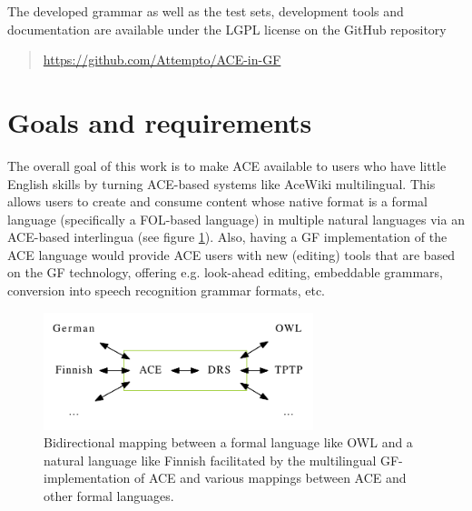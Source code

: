 \documentclass[a4paper]{article}
\begin{document}
The developed grammar as well as the test sets, development tools and
documentation are available under the LGPL license on the GitHub repository

\begin{quote}
\url{https://github.com/Attempto/ACE-in-GF}
\end{quote}

\section{Goals and requirements}
\label{section:Goals_and_requirements}

The overall goal of this work is to make ACE available to users who have little
English skills by turning ACE-based systems like
AceWiki \cite{kuhn2010doctoralthesis} multilingual. This allows users
to create and consume content whose native format is a formal language
(specifically a FOL-based language) in multiple natural languages
via an ACE-based interlingua (see figure \ref{fig:languages}).
Also, having a GF implementation of the ACE language would
provide ACE users with new (editing) tools that are based on the GF technology,
offering e.g. look-ahead editing, embeddable grammars, conversion into
speech recognition grammar formats, etc.

\begin{figure}[ht]
\centering
\includegraphics[width=0.7\textwidth]{languages}
\caption[Languages]
{Bidirectional mapping between a formal language like OWL and a natural
language like Finnish facilitated by the multilingual GF-implementation of
ACE and various mappings between ACE and other formal languages.}
\label{fig:languages}
\end{figure}

%
\end{document}
